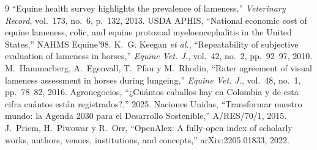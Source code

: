 \documentclass[conference,a4paper]{IEEEtran}
\begin{document}
\begin{thebibliography}{9}
 ``Equine health survey highlights the prevalence of lameness,'' \emph{Veterinary Record}, vol.~173, no.~6, p.~132, 2013.
 USDA APHIS, ``National economic cost of equine lameness, colic, and equine protozoal myeloencephalitis in the United States,'' NAHMS Equine'98.
 K.~G. Keegan \emph{et al.}, ``Repeatability of subjective evaluation of lameness in horses,'' \emph{Equine Vet. J.}, vol.~42, no.~2, pp.~92--97, 2010.
 M.~Hammarberg, A.~Egenvall, T.~Pfau y M.~Rhodin, ``Rater agreement of visual lameness assessment in horses during lungeing,'' \emph{Equine Vet. J.}, vol.~48, no.~1, pp.~78--82, 2016.
 Agronegocios, ``¿Cuántos caballos hay en Colombia y de esta cifra cuántos están registrados?,'' 2025.
 Naciones Unidas, ``Transformar nuestro mundo: la Agenda 2030 para el Desarrollo Sostenible,'' A/RES/70/1, 2015.
 J.~Priem, H.~Piwowar y R.~Orr, ``OpenAlex: A fully-open index of scholarly works, authors, venues, institutions, and concepts,'' arXiv:2205.01833, 2022.
\end{thebibliography}
\end{document}

